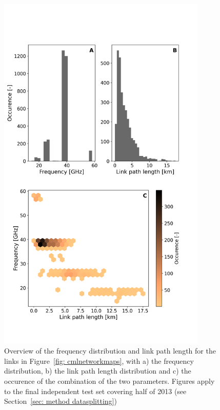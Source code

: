 \documentclass[twocolumn, 10pt, a4paper]{memoir}
\begin{document}
	\begin{figure}[t]
		\includegraphics[width=10cm]{val_freq_dist}
		\vspace*{-1cm}
		\caption{Overview of the frequency distribution and link path length for the links in Figure~\ref{fig: cmlnetworkmaps}, with a) the frequency distribution, b) the link path length distribution and c) the occurence of the combination of the two parameters. Figures apply to the final independent test set covering half of 2013 (see Section~\ref{sec: method datasplitting})}
		\label{fig: CML validation}
	\end{figure}
\end{document}
